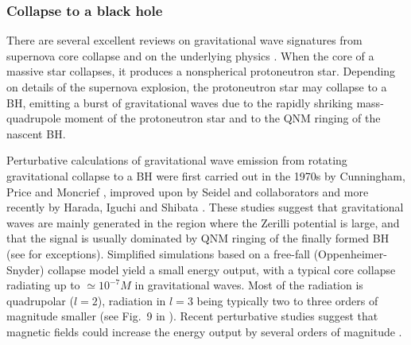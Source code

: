 \documentclass[]{iopart}
\begin{document}
\subsubsection*{\label{ssec:collapse}Collapse to a black hole} 

There are several excellent reviews on gravitational wave signatures from
supernova core collapse and on the underlying physics
\cite{Nakamura:1987zz,Fryer:2003,Kotake:2005zn,Janka:2006fh,Ott:2008wt}.  When
the core of a massive star collapses, it produces a nonspherical protoneutron
star. 
Depending on details of the supernova explosion, the protoneutron star may
collapse to a BH, emitting a burst of gravitational waves due to the rapidly
shriking mass-quadrupole moment of the protoneutron star and to the QNM
ringing of the nascent BH.

Perturbative calculations of gravitational wave emission from rotating
gravitational collapse to a BH were first carried out in the 1970s by
Cunningham, Price and Moncrief \cite{Cunningham1,Cunningham2,Cunningham3},
improved upon by Seidel and collaborators
\cite{Seidel:1987in,Seidel:1988za,Seidel:1990xb,Seidel:1991my} and more
recently by Harada, Iguchi and Shibata \cite{Harada:2003bu}. These studies
suggest that gravitational waves are mainly generated in the region where the
Zerilli potential is large, and that the signal is usually dominated by QNM
ringing of the finally formed BH (see \cite{Harada:2003bu} for
exceptions). Simplified simulations based on a free-fall (Oppenheimer-Snyder)
collapse model yield a small energy output, with a typical core collapse
radiating up to $\simeq 10^{-7} M$ in gravitational waves. Most of the
radiation is quadrupolar ($l=2$), radiation in $l=3$ being typically two to
three orders of magnitude smaller (see Fig.~9 in \cite{Cunningham1}).  Recent
perturbative studies suggest that magnetic fields could increase the energy
output by several orders of magnitude \cite{Sotani:2007jv,Sotani:2009cm}.
\end{document}
